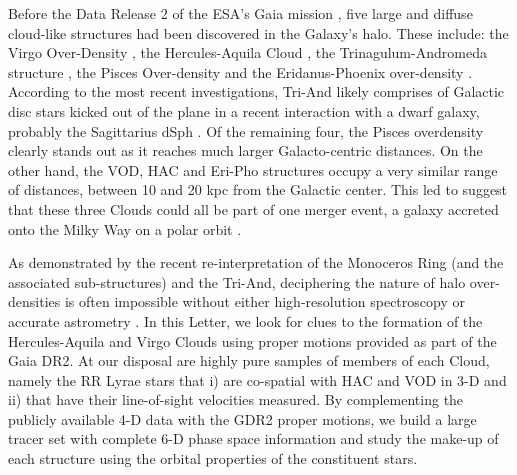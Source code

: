 \documentclass[fleqn,usenatbib]{mnras}
\begin{document}
Before the Data Release 2 \citep[][]{Brown2018} of the ESA's Gaia
mission \citep[][]{Prusti2016}, five large and diffuse cloud-like
structures had been discovered in the Galaxy's halo. These include:
the Virgo Over-Density
\citep[VOD,][]{Vivas2001,Newberg2002,Duffau2006,Juric2008,Bonaca2012},
the Hercules-Aquila Cloud \citep[HAC,][]{Be07,Simion2014}, the
Trinagulum-Andromeda structure
\citep[Tri-And,][]{Rocha2004,Majewski2004,Deason2014}, the Pisces
Over-density \citep[][]{Sesar2007,Wa09,Nie2015} and the
Eridanus-Phoenix over-density \citep[Eri-Pho,][]{Li2016}. According to
the most recent investigations, Tri-And likely comprises of Galactic
disc stars kicked out of the plane in a recent interaction with a
dwarf galaxy, probably the Sagittarius dSph
\citep[e.g.][]{Pr15,Bergemann2018,Hayes2018}. Of the remaining four,
the Pisces overdensity clearly stands out as it reaches much larger
Galacto-centric distances. On the other hand, the VOD, HAC and Eri-Pho
structures occupy a very similar range of distances, between 10 and 20
kpc from the Galactic center. This led \citet{Li2016} to suggest that
these three Clouds could all be part of one merger event, a galaxy
accreted onto the Milky Way on a polar orbit \citep[see also][]{Juric2008}.

As demonstrated by the recent re-interpretation of the Monoceros Ring
(and the associated sub-structures) and the Tri-And, deciphering the
nature of halo over-densities is often impossible without either
high-resolution spectroscopy \citep[e.g.][]{Bergemann2018} or accurate
astrometry \citep[e.g.][]{deBoer2018,Deason2018}. In this Letter, we
look for clues to the formation of the Hercules-Aquila and Virgo
Clouds using proper motions provided as part of the Gaia DR2. At our
disposal are highly pure samples of members of each Cloud, namely the
RR Lyrae stars that i) are co-spatial with HAC and VOD in 3-D and ii)
that have their line-of-sight velocities measured. By complementing
the publicly available 4-D data with the GDR2 proper motions, we build
a large tracer set with complete 6-D phase space information and study
the make-up of each structure using the orbital properties of the
constituent stars.
%
\end{document}

